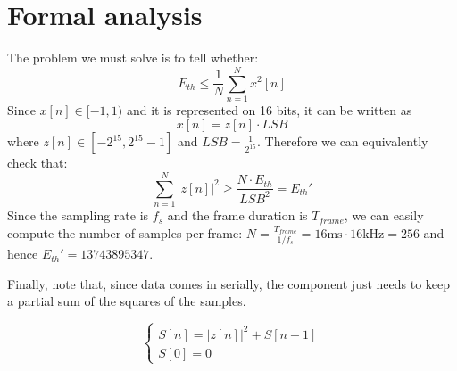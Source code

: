 \section{Formal analysis}
The problem we must solve is to tell whether:
\begin{equation}
  E_{th} \le \frac{1}{N} \sum_{n=1}^N x^2[n]
\end{equation}
Since $ x[n] \in [-1, 1) $ and it is represented on 16 bits, it can be
written as
\begin{equation}
  x[n] = z[n]\cdot LSB
\end{equation}
where $z[n] \in [-2^{15}, 2^{15} - 1]$ and $LSB = \frac{1}{2^{15}}$. Therefore we
can equivalently check that:
\begin{equation}
  \sum_{n=1}^N |z[n]|^2 \ge \frac{N \cdot E_{th}}{LSB^2} = E_{th}'
\end{equation}
Since the sampling rate is $f_s$ and the frame duration is $T_{frame}$,
we can easily compute the number of samples per frame:
$N = \frac{T_{frame}}{1/f_s} = 16\si{\milli\second} \cdot 16\si{\kilo\hertz} = 256$
and hence $E_{th}' = 13743895347$.




Finally, note that, since data comes in serially, the component just needs to 
keep a partial sum of the squares of the samples.

\begin{equation}
  \begin{cases}
    S[n] = |z[n]|^2 + S[n - 1] \\
    S[0] = 0
  \end{cases}
\end{equation}
